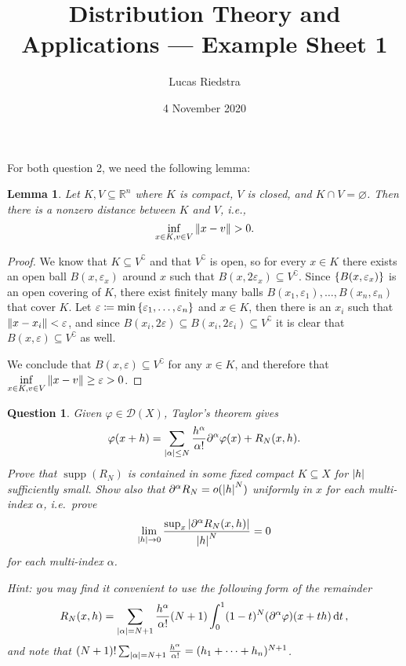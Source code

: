 \documentclass{article}
\title{Distribution Theory and Applications --- Example Sheet 1} %
\author{Lucas Riedstra}
\date{4 November 2020} %
\theoremstyle{plain}
\newtheorem{question}{Question}
\newtheorem{lemma}{Lemma}
\theoremstyle{remark}
\renewcommand{\emptyset}{\varnothing}
\renewcommand{\epsilon}{\varepsilon}
\renewcommand{\phi}{\varphi}
\newcommand{\Bb}{\mathbb}
\newcommand{\Cal}{\mathcal}
\newcommand{\RR}{\Bb R}
\newcommand{\DD}{\Cal D}
\newcommand{\C}{^\complement} %
\newcommand\ceq\coloneqq %
\newcommand\eps\epsilon
\newcommand\pt\partial
\DeclareMathOperator{\supp}{supp}
\begin{document}
\maketitle


\begin{mdframed}
For both question 2, we need the following lemma:
\begin{lemma} \label{lem:distance_compact_closed}
	Let $K, V \subseteq \RR^n$ where $K$ is compact, $V$ is closed, and $K \cap V = \emptyset$. Then there is a nonzero distance between $K$ and $V$, i.e., 
	\[
	\inf_{x \in K, v \in V} \norm{x - v} > 0. 
	\]
\end{lemma}

\begin{proof}
	We know that $K \subseteq V\C$ and that $V\C$ is open, so for every $x \in K$ there exists an open ball $B(x, \eps_x)$ around $x$ such that $B(x, 2\eps_x) \subseteq V\C$. Since $\qty{B(x, \eps_x)}$ is an open covering of $K$, there exist finitely many balls $B(x_1, \eps_1), \dotsc, B(x_n, \eps_n)$ that cover $K$. Let $\eps \ceq \min\qty{\eps_1, \dotsc, \eps_n}$ and $x \in K$, then there is an $x_i$ such that $\norm{x - x_i} < \eps$, and since $B(x_i, 2\eps) \subseteq B(x_i, 2\eps_i) \subseteq V\C$ it is clear that $B(x, \eps) \subseteq V\C$ as well. 
	
	We conclude that $B(x, \eps) \subseteq V\C$ for any $x \in K$, and therefore that $\inf\limits_{x \in K, v \in V} \norm{x - v} \geq \eps > 0$. 
\end{proof}
\end{mdframed}

\setcounter{question}{1}
\begin{question}
	Given $\phi \in \DD(X)$, Taylor's theorem gives
	\[
	\phi(x+h) = \sum_{\abs{\alpha} \leq N} \frac{h^\alpha}{\alpha!} \pt^\alpha \phi(x) + R_N(x, h).
	\]
	Prove that $\supp(R_N)$ is contained in some fixed compact $K \subseteq X$ for $\abs{h}$ sufficiently small. Show also that $\pt^\alpha R_N = o(\abs{h}^N)$ uniformly in $x$ for each multi-index $\alpha$, i.e.\ prove 
	\[
	\lim_{\abs{h}\to 0} \frac{\sup_x \abs{\pt^\alpha R_N(x, h)}}{\abs{h}^N} = 0
	\]
	for each multi-index $\alpha$.  
	
	\emph{Hint:} you may find it convenient to use the following form of the remainder
	\[
	R_N(x, h) = \sum_{\abs{\alpha} = N+1} \frac{h^\alpha}{\alpha!}(N+1)\int_0^1 (1-t)^N (\pt^\alpha\phi)(x + th)\dd{t},
	\]
	and note that $(N+1)! \sum_{\abs{\alpha} = N+1} \frac{h^\alpha}{\alpha!} = (h_1 + \dotsb + h_n)^{N+1}$. 
\end{question}
\end{document}
